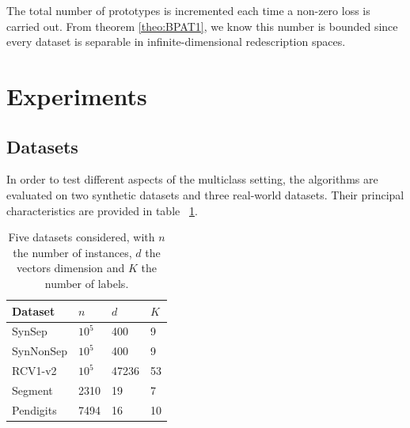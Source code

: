 \documentclass[preprint,12pt,authoryear]{elsarticle}
\begin{document}
The total number of prototypes is incremented each time a non-zero loss is carried out. From theorem \ref{theo:BPAT1}, we know this number is bounded since every dataset is separable in infinite-dimensional redescription spaces. 

  



\section{Experiments}
\subsection{Datasets}
\label{subsec:BPAE}

In order to test different aspects of the multiclass setting, the algorithms are evaluated on two synthetic datasets and three real-world datasets.  Their principal characteristics are provided in table ~\ref{table:mce}.

\begin{table}[h]
	\caption{Five datasets considered, with $n$ the number of instances, $d$ the vectors dimension and $K$ the number of labels.}
	\label{table:mce}
	\begin{center}
		\begin{tabular}{l l l l}
			{\bf Dataset}  & {\bf $n$} & {\bf $d$} & {\bf $K$}\\
			\hline
			SynSep & $10^5$ 	& 400 	& 9 \\
			
			SynNonSep & $10^5$ & 400 	& 9 \\
			
			RCV1-v2  & $10^5$ 	& 47236 	& 53 \\
			
			Segment & 2310	& 19	& 7	\\
			
			Pendigits 	& 7494	& 16	& 10	\\
		\end{tabular}
	\end{center}
\end{table}
\end{document}
